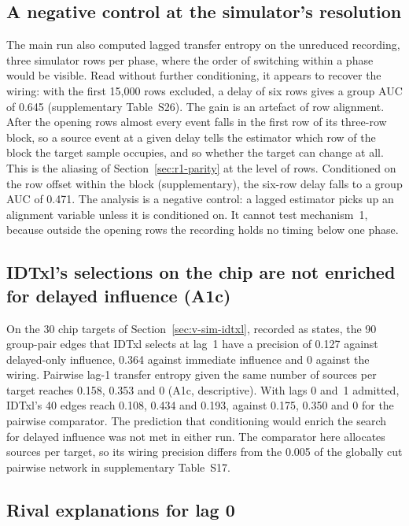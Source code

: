 \subsection{A negative control at the simulator's resolution}
\label{sec:r1-stride1}

The main run also computed lagged transfer entropy on the unreduced recording, three simulator rows per phase, where the order of switching within a phase would be visible. Read without further conditioning, it appears to recover the wiring: with the first 15,000 rows excluded, a delay of six rows gives a group AUC of 0.645 (supplementary Table~S26). The gain is an artefact of row alignment. After the opening rows almost every event falls in the first row of its three-row block, so a source event at a given delay tells the estimator which row of the block the target sample occupies, and so whether the target can change at all. This is the aliasing of Section~\ref{sec:r1-parity} at the level of rows. Conditioned on the row offset within the block (supplementary), the six-row delay falls to a group AUC of 0.471. The analysis is a negative control: a lagged estimator picks up an alignment variable unless it is conditioned on. It cannot test mechanism~1, because outside the opening rows the recording holds no timing below one phase.


\subsection{IDTxl's selections on the chip are not enriched for delayed influence (A1c)}

On the 30 chip targets of Section~\ref{sec:v-sim-idtxl}, recorded as states, the 90 group-pair edges that IDTxl selects at lag~1 have a precision of 0.127 against delayed-only influence, 0.364 against immediate influence and 0 against the wiring. Pairwise lag-1 transfer entropy given the same number of sources per target reaches 0.158, 0.353 and 0 (A1c, descriptive). With lags 0 and~1 admitted, IDTxl's 40 edges reach 0.108, 0.434 and 0.193, against 0.175, 0.350 and 0 for the pairwise comparator. The prediction that conditioning would enrich the search for delayed influence was not met in either run. The comparator here allocates sources per target, so its wiring precision differs from the 0.005 of the globally cut pairwise network in supplementary Table~S17.



\subsection{Rival explanations for lag 0}
\label{sec:r1-rivals}


